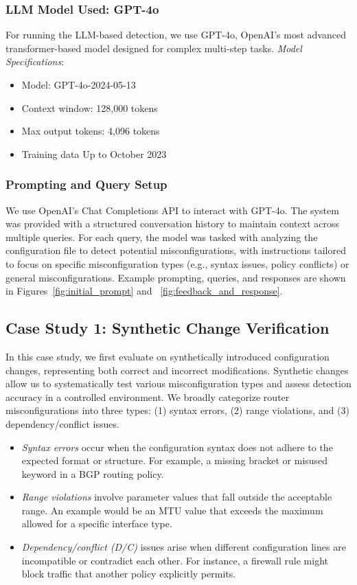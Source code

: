 \subsubsection{LLM Model Used: GPT-4o} For running the LLM-based detection, we use GPT-4o, OpenAI's most advanced transformer-based model designed for complex multi-step tasks.
\textit{Model Specifications}:
\begin{itemize}
    \item Model: GPT-4o-2024-05-13
    \item Context window: 128,000 tokens 
    \item Max output tokens: 4,096 tokens
    \item Training data Up to October 2023
\end{itemize}

\subsubsection{Prompting and Query Setup}
We use OpenAI’s Chat Completions API to interact with GPT-4o. The system was provided with a structured conversation history to maintain context across multiple queries. For each query, the model was tasked with analyzing the configuration file to detect potential misconfigurations, with instructions tailored to focus on specific misconfiguration types (e.g., syntax issues, policy conflicts) or general misconfigurations. Example prompting, queries, and responses are shown in Figures~\ref{fig:initial_prompt} and ~\ref{fig:feedback_and_response}.

\subsection{Case Study 1: Synthetic Change Verification}
In this case study, we first evaluate \sysname{} on synthetically introduced configuration changes, representing both correct and incorrect modifications. Synthetic changes allow us to systematically test various misconfiguration types and assess detection accuracy in a controlled environment.
We broadly categorize router misconfigurations into three types: (1) syntax errors, (2) range violations, and (3) dependency/conflict issues.
\begin{itemize}
    \item \textit{Syntax errors} occur when the configuration syntax does not adhere to the expected format or structure. For example, a missing bracket or misused keyword in a BGP routing policy.
    \item \textit{Range violations} involve parameter values that fall outside the acceptable range. An example would be an MTU value that exceeds the maximum allowed for a specific interface type.
    \item \textit{Dependency/conflict (D/C)} issues arise when different configuration lines are incompatible or contradict each other. For instance, a firewall rule might block traffic that another policy explicitly permits.
\end{itemize}



